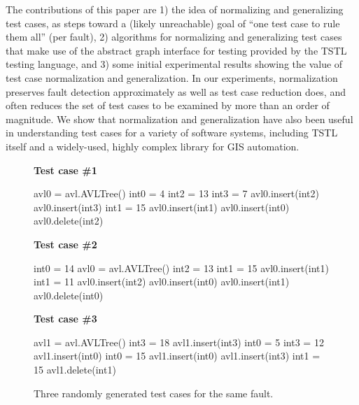 The contributions of this paper are 1) the idea of normalizing and
generalizing test cases, as steps toward a (likely unreachable) goal
of ``one test case to rule them all'' (per fault), 2) algorithms for
normalizing and generalizing test cases that make use of the abstract
graph interface for testing provided by the TSTL
\cite{tstl,NFM15,ISSTA15} testing language, and 3) some initial
experimental results showing the value of test case normalization and
generalization.  In our experiments, normalization preserves fault
detection approximately as well as test case reduction does, and often
reduces the set of test cases to be examined by more than an order of
magnitude.  We show that normalization and generalization have also
been useful in understanding test cases for a variety of software
systems, including TSTL itself and a widely-used, highly complex
library for GIS automation.

\begin{figure}
{\scriptsize
{\bf Test case \#1}
\begin{code}
avl0 = avl.AVLTree() 
int0 = 4 
int2 = 13 
int3 = 7 
avl0.insert(int2) 
avl0.insert(int3) 
int1 = 15 
avl0.insert(int1) 
avl0.insert(int0) 
avl0.delete(int2)
\end{code}
{\bf Test case \#2}
\begin{code}
int0 = 14 
avl0 = avl.AVLTree() 
int2 = 13 
int1 = 15 
avl0.insert(int1) 
int1 = 11 
avl0.insert(int2) 
avl0.insert(int0) 
avl0.insert(int1) 
avl0.delete(int0) 
\end{code}
{\bf Test case \#3}
\begin{code}
avl1 = avl.AVLTree() 
int3 = 18 
avl1.insert(int3) 
int0 = 5 
int3 = 12 
avl1.insert(int0) 
int0 = 15 
avl1.insert(int0) 
avl1.insert(int3) 
int1 = 15 
avl1.delete(int1) 
\end{code}
}
\caption {Three randomly generated test cases for the same fault.}
\label{threetests}
\end{figure}

